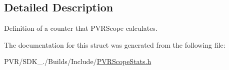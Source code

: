 \subsection{Detailed Description}
Definition of a counter that P\+V\+R\+Scope calculates. 



 

The documentation for this struct was generated from the following file\+:\begin{DoxyCompactItemize}
\item 
P\+V\+R/\+S\+D\+K\+\_./\+Builds/\+Include/\hyperlink{_p_v_r_scope_stats_8h}{P\+V\+R\+Scope\+Stats.\+h}\end{DoxyCompactItemize}
